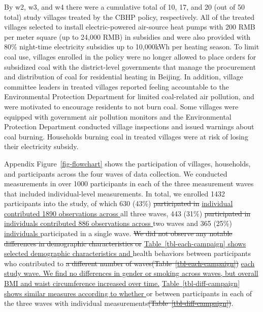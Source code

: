 \documentclass[
  letterpaper,
  DIV=11,
  numbers=noendperiod]{scrartcl}
\providecommand{\DIFadd}[1]{{\protect\color{blue}\underline{#1}}} %
\providecommand{\DIFdel}[1]{{\protect\color{red}\sout{#1}}}                      %
\providecommand{\DIFaddbegin}{} %
\providecommand{\DIFaddend}{} %
\providecommand{\DIFdelbegin}{} %
\providecommand{\DIFdelend}{} %
\newcommand{\DIFscaledelfig}{0.5}
\newlength{\DIFdelgraphicswidth} %
\newlength{\DIFdelgraphicsheight} %
\newcommand{\DIFaddincludegraphics}[2][]{{\color{blue}\fbox{\DIFOincludegraphics[#1]{#2}}}} %
\newcommand{\DIFdelincludegraphics}[2][]{%
\sbox{\DIFdelgraphicsbox}{\DIFOincludegraphics[#1]{#2}}%
\settoboxwidth{\DIFdelgraphicswidth}{\DIFdelgraphicsbox} %
\settoboxtotalheight{\DIFdelgraphicsheight}{\DIFdelgraphicsbox} %
\scalebox{\DIFscaledelfig}{%
\parbox[b]{\DIFdelgraphicswidth}{\usebox{\DIFdelgraphicsbox}\\[-\baselineskip] \rule{\DIFdelgraphicswidth}{0em}}\llap{\resizebox{\DIFdelgraphicswidth}{\DIFdelgraphicsheight}{%
\setlength{\unitlength}{\DIFdelgraphicswidth}%
\begin{picture}(1,1)%
\thicklines\linethickness{2pt} %
{\color[rgb]{1,0,0}\put(0,0){\framebox(1,1){}}}%
{\color[rgb]{1,0,0}\put(0,0){\line( 1,1){1}}}%
{\color[rgb]{1,0,0}\put(0,1){\line(1,-1){1}}}%
\end{picture}%
}\hspace*{3pt}}} %
} %
\DeclareRobustCommand{\DIFaddbegin}{\DIFOaddbegin \let\includegraphics\DIFaddincludegraphics} %
\DeclareRobustCommand{\DIFaddend}{\DIFOaddend \let\includegraphics\DIFOincludegraphics} %
\DeclareRobustCommand{\DIFdelbegin}{\DIFOdelbegin \let\includegraphics\DIFdelincludegraphics} %
\DeclareRobustCommand{\DIFdelend}{\DIFOaddend \let\includegraphics\DIFOincludegraphics} %
\begin{document}
By w2, w3, and w4 there were a cumulative total of 10, 17, and 20 (out
of 50 total) study villages treated by the CBHP policy, respectively.
All of the treated villages selected to install electric-powered
air-source heat pumps with 200 RMB per meter square (up to 24,000 RMB)
in subsidies and were also provided with 80\% night-time electricity
subsidies up to 10,000kWh per heating season. To limit coal use,
villages enrolled in the policy were no longer allowed to place orders
for subsidized coal with the district-level governments that manage the
procurement and distribution of coal for residential heating in Beijing.
In addition, village committee leaders in treated villages reported
feeling accountable to the Environmental Protection Department for
limited coal-related air pollution, and were motivated to encourage
residents to not burn coal. Some villages were equipped with government
air pollution monitors and the Environmental Protection Department
conducted village inspections and issued warnings about coal burning.
Households burning coal in treated villages were at risk of losing their
electricity subsidy.

Appendix Figure~\ref{fig-flowchart} shows the participation of villages,
households, and participants across the four waves of data collection.
We conducted measurements in over 1000 participants in each of the three
measurement waves that included individual-level measurements. In total,
we enrolled 1432 participants into the study, of which 630 (43\%)
\DIFdelbegin \DIFdel{participated in }\DIFdelend \DIFaddbegin \DIFadd{individual contributed 1890 observations across }\DIFaddend all three waves, 443
(31\%) \DIFdelbegin \DIFdel{participated in }\DIFdelend \DIFaddbegin \DIFadd{individuals contributed 886 observations across }\DIFaddend two waves and 365
(25\%) \DIFaddbegin \DIFadd{individuals }\DIFaddend participated in a single wave.
\DIFdelbegin \DIFdel{We did not observe any
notable differences in demographic characteristics
or }\DIFdelend \DIFaddbegin \DIFadd{Table~\ref{tbl-each-campaign} shows selected demographic characteristics
and }\DIFaddend health behaviors between participants who contributed to \DIFdelbegin \DIFdel{a different number of waves(Table~\ref{tbl-each-campaign}) }\DIFdelend \DIFaddbegin \DIFadd{each study
wave. We find no differences in gender or smoking across waves, but
overall BMI and waist circumference increased over time.}
\DIFadd{Table~\ref{tbl-diff-campaign} shows similar measures according to
whether }\DIFaddend or between participants in each of the three waves with
individual measurements\DIFdelbegin \DIFdel{(Table~\ref{tbl-diff-campaign})}\DIFdelend .
\end{document}
